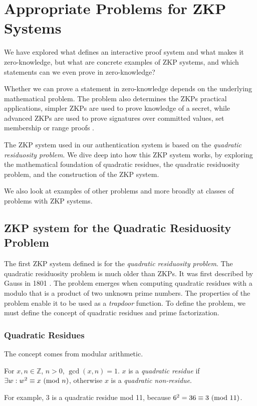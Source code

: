 \section{Appropriate Problems for ZKP Systems}
We have explored what defines an interactive proof system and what makes it zero-knowledge, but what are concrete examples of ZKP systems, and which statements can we even prove in zero-knowledge?

Whether we can prove a statement in zero-knowledge depends on the underlying mathematical problem.
The problem also determines the ZKPs practical applications, simpler ZKPs are used to prove knowledge of a secret, while advanced ZKPs are used to prove signatures over committed values, set membership or range proofs \cite{camenisch2008efficient, bunz2018bulletproofs, camenisch2001efficient, bowe2018multi}.

The ZKP system \cite{goldwasser1989knowledge} used in our authentication system is based on the \textit{quadratic residuosity problem}.
We dive deep into how this ZKP system works, by exploring the mathematical foundation of quadratic residues, the quadratic residuosity problem, and the construction of the ZKP system.

We also look at examples of other problems and more broadly at classes of problems with ZKP systems.

\subsection{ZKP system for the Quadratic Residuosity Problem}
\label{zkp-qrp}
The first ZKP system defined \cite{goldwasser1989knowledge} is for the \textit{quadratic residuosity problem}.
The quadratic residuosity problem is much older than ZKPs. It was first described by Gauss in 1801 \cite{10.2307/j.ctt1cc2mnd}.
The problem emerges when computing quadratic residues with a modulo that is a product of two unknown prime numbers.
The properties of the problem enable it to be used as a \textit{trapdoor} function. 
To define the problem, we must define the concept of quadratic residues and prime factorization.

\subsubsection{Quadratic Residues} 
The concept \cite{andrews1994number} comes from modular arithmetic.

\begin{definition}
	For $x, n \in \mathbb{Z}$, $n > 0$, $\gcd(x, n) = 1 $.
	$x$ is a \textit{quadratic residue} if  $\exists w:w^2 \equiv x \ (\mathrm{mod}\ n)$, otherwise $x$ is a \textit{quadratic non-residue}.
\end{definition}
\noindent For example,
$3$ is a quadratic residue mod 11, because $6^2 = 36 \equiv 3 \ (\mathrm{mod}\ 11)$.


